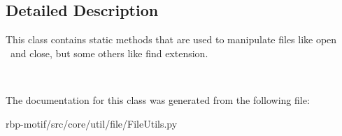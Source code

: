 \subsection{Detailed Description}
This class contains static methods that are used to manipulate files like open  and close, but some others like find extension. 

  

The documentation for this class was generated from the following file\-:\begin{DoxyCompactItemize}
\item 
rbp-\/motif/src/core/util/file/File\-Utils.\-py\end{DoxyCompactItemize}
